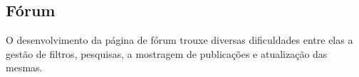 \subsection{Fórum}
O desenvolvimento da página de fórum trouxe diversas dificuldades entre elas a gestão de filtros, pesquisas, a mostragem de publicações e atualização das mesmas.


\vspace{10mm}
\begin{figure}[htb]%
  \centering
  \qquad
  \label{fig:72}%
\end{figure}
\vspace{10mm}

\newpage

